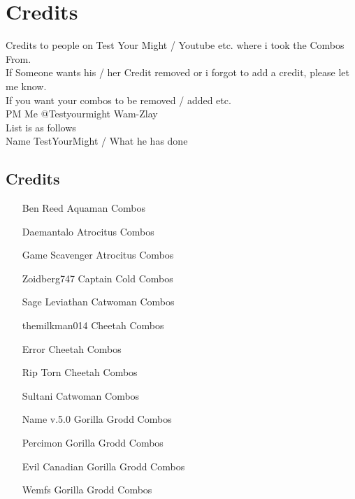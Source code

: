 \documentclass[main.tex]{subfiles}
\begin{document}
\chapter{Credits}

Credits to people on Test Your Might / Youtube etc. where i took the Combos From.\\If Someone wants his / her Credit removed or i forgot to add a credit, please let me know.\\
If you want your combos to be removed / added etc.\\
PM Me @Testyourmight Wam-Zlay\\

List is as follows\\

Name TestYourMight / What he has done\\

\section{Credits}

\begin{itemize}
\item [Ben Reed] Aquaman Combos 
\item [Daemantalo] Atrocitus Combos
\item [Game Scavenger] Atrocitus Combos
\item [Zoidberg747] Captain Cold Combos
\item [Sage Leviathan] Catwoman Combos
\item [themilkman014] Cheetah Combos
\item [Error] Cheetah Combos
\item [Rip Torn] Cheetah Combos
\item [Sultani] Catwoman Combos
\item [Name v.5.0] Gorilla Grodd Combos 
\item [Percimon] Gorilla Grodd Combos
\item [Evil Canadian] Gorilla Grodd Combos
\item [Wemfs] Gorilla Grodd Combos
\end{itemize}
\end{document}
